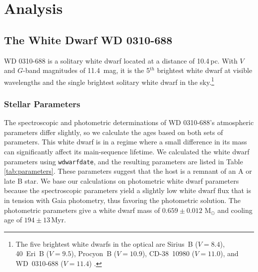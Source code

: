 \documentclass[twocolumn]{aastex631}
\begin{document}
\section{Analysis} \label{sec:Analysis}

\subsection{The White Dwarf WD 0310-688}\label{WDparams}
WD 0310-688 is a solitary white dwarf located at a distance of 10.4\,pc. With $V$ and $G$-band magnitudes of 11.4~mag, it is the 5$^{th}$ brightest white dwarf at visible wavelengths and the single brightest solitary white dwarf in the sky.\footnote{The five brightest white dwarfs in the optical are Sirius~B ($V=8.4$), 40~Eri~B ($V=9.5$), Procyon~B ($V=10.9$), CD-38~10980 ($V=11.0$), and WD~0310-688 ($V=11.4$) \citep{Holberg2008, 2021MNRAS.508.3877G}.}

\subsubsection{Stellar Parameters}
The spectroscopic \citep{2017ApJ...848...11B} and photometric \citep{2021MNRAS.508.3877G} determinations of WD 0310-688's atmospheric parameters differ slightly, so we calculate the ages based on both sets of parameters. This white dwarf is in a regime where a small difference in its mass can significantly affect its main-sequence lifetime. We calculated the white dwarf parameters using \texttt{wdwarfdate}, and the resulting parameters are listed in Table \ref{tab:parameters}. These parameters suggest that the host is a remnant of an A or late B star. We base our calculations on photometric white dwarf parameters because the spectroscopic parameters yield a slightly low white dwarf flux that is in tension with Gaia photometry, thus favoring the photometric solution. The photometric parameters give a white dwarf mass of $0.659 \pm 0.012$ M$_\odot$ and cooling age of $194 \pm 13$\,Myr.
\end{document}
